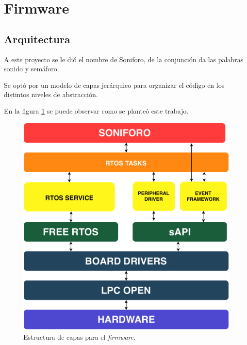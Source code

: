 \section{Firmware}
\subsection{Arquitectura}
A este proyecto se le dió el nombre de Soniforo, de la conjunción da las palabras sonido y semáforo.

Se optó por un modelo de capas jerárquico para organizar el código en los distintos niveles de abstracción.

En la figura \ref{fig:arquitecturaFirmwareGeneralSistema} se puede observar como se planteó este trabajo. 
\begin{figure}[h]
	\centering
	\includegraphics[scale=.5]{./Figures/arquitecturaGeneralSistema.pdf}
	\caption{Estructura de capas para el \textit{firmware}.}
	\label{fig:arquitecturaFirmwareGeneralSistema}
\end{figure}

